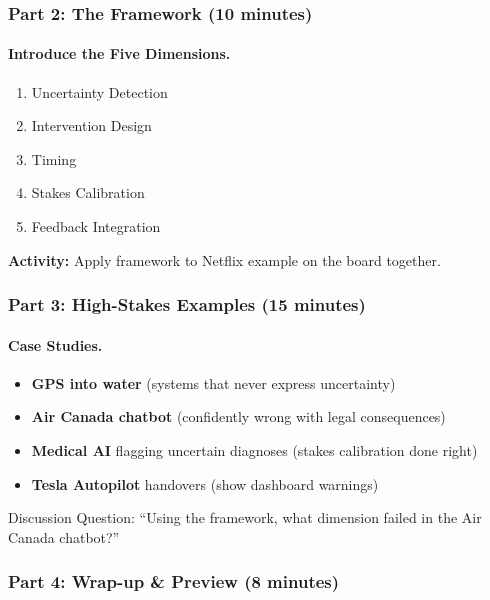 \subsubsection{Part 2: The Framework (10 minutes)}

\paragraph{Introduce the Five Dimensions.}
\begin{enumerate}
    \item Uncertainty Detection
    \item Intervention Design
    \item Timing
    \item Stakes Calibration
    \item Feedback Integration
\end{enumerate}

\textbf{Activity:} Apply framework to Netflix example on the board together.

\subsubsection{Part 3: High-Stakes Examples (15 minutes)}

\paragraph{Case Studies.}
\begin{itemize}
    \item \textbf{GPS into water} (systems that never express uncertainty)
    \item \textbf{Air Canada chatbot} (confidently wrong with legal consequences)
    \item \textbf{Medical AI} flagging uncertain diagnoses (stakes calibration done right)
    \item \textbf{Tesla Autopilot} handovers (show dashboard warnings)
\end{itemize}

\begin{trythis}
Discussion Question: ``Using the framework, what dimension failed in the Air Canada chatbot?''
\end{trythis}

\subsubsection{Part 4: Wrap-up \& Preview (8 minutes)}

